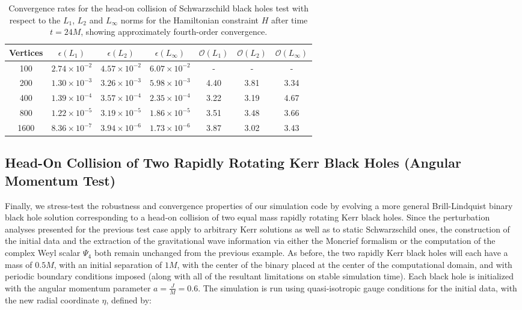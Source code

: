 \documentclass{article}
\begin{document}
\begin{table}
\centering
\begin{tabular}{|c|c|c|c|c|c|c|}
\hline
Vertices & ${\epsilon \left( L_1 \right)}$ & ${\epsilon \left( L_2 \right)}$ & ${\epsilon \left( L_{\infty} \right)}$ & ${\mathcal{O} \left( L_1 \right)}$ & ${\mathcal{O} \left( L_2 \right)}$ & ${\mathcal{O} \left( L_{\infty} \right)}$\\
\hline\hline
100 & ${2.74 \times 10^{-2}}$ & ${4.57 \times 10^{-2}}$ & ${6.07 \times 10^{-2}}$ & - & - & -\\
\hline
200 & ${1.30 \times 10^{-3}}$ & ${3.26 \times 10^{-3}}$ & ${5.98 \times 10^{-3}}$ & 4.40 & 3.81 & 3.34\\
\hline
400 & ${1.39 \times 10^{-4}}$ & ${3.57 \times 10^{-4}}$ & ${2.35 \times 10^{-4}}$ & 3.22 & 3.19 & 4.67\\
\hline
800 & ${1.22 \times 10^{-5}}$ & ${3.19 \times 10^{-5}}$ & ${1.86 \times 10^{-5}}$ & 3.51 & 3.48 & 3.66\\
\hline
1600 & ${8.36 \times 10^{-7}}$ & ${3.94 \times 10^{-6}}$ & ${1.73 \times 10^{-6}}$ & 3.87 & 3.02 & 3.43\\
\hline
\end{tabular}
\caption{Convergence rates for the head-on collision of Schwarzschild black holes test with respect to the ${L_1}$, ${L_2}$ and ${L_{\infty}}$ norms for the Hamiltonian constraint $H$ after time ${t = 24 M}$, showing approximately fourth-order convergence.}
\label{tab:Table4}
\end{table}

\clearpage

\subsection{Head-On Collision of Two Rapidly Rotating Kerr Black Holes (Angular Momentum Test)}

Finally, we stress-test the robustness and convergence properties of our simulation code by evolving a more general Brill-Lindquist binary black hole solution corresponding to a head-on collision of two equal mass rapidly rotating Kerr black holes. Since the perturbation analyses presented for the previous test case apply to arbitrary Kerr solutions as well as to static Schwarzschild ones, the construction of the initial data and the extraction of the gravitational wave information via either the Moncrief formalism or the computation of the complex Weyl scalar ${\Psi_4}$ both remain unchanged from the previous example. As before, the two rapidly Kerr black holes will each have a mass of ${0.5 M}$, with an initial separation of ${1 M}$, with the center of the binary placed at the center of the computational domain, and with periodic boundary conditions imposed (along with all of the resultant limitations on stable simulation time). Each black hole is initialized with the angular momentum parameter ${a = \frac{J}{M} = 0.6}$. The simulation is run using quasi-isotropic gauge conditions for the initial data, with the new radial coordinate ${\eta}$, defined by:
\end{document}
